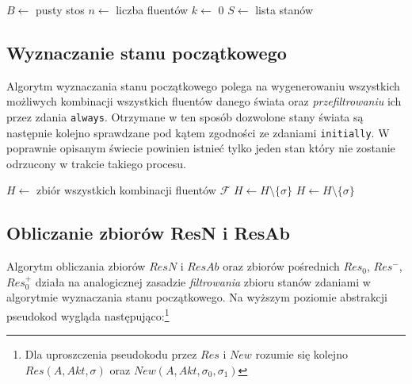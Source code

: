 \documentclass{article}
\begin{document}
\begin{algorithm}[H]
\begin{algorithmic}
\State $B \gets $ pusty stos
\State $n \gets $ liczba fluentów
\State $k \gets $ 0
\State $S \gets $ lista stanów
    \EndIf
	\State {}
	\State {}
	\State {}
	\State {}
	\State {}
	\State {}
	\State {}
\EndFunction
\end{algorithmic}
\end{algorithm}

\newpage
\subsection{Wyznaczanie stanu początkowego}

Algorytm wyznaczania stanu początkowego polega na wygenerowaniu wszystkich możliwych kombinacji wszystkich fluentów danego świata oraz \textit{przefiltrowaniu} ich przez zdania \texttt{always}. Otrzymane w ten sposób dozwolone stany świata są następnie kolejno sprawdzane pod kątem zgodności ze zdaniami \texttt{initially}. W poprawnie opisanym świecie powinien istnieć tylko jeden stan który nie zostanie odrzucony w trakcie takiego procesu.

\begin{algorithm}[H]
\begin{algorithmic}
\State $H \gets $ zbiór wszystkich kombinacji fluentów $\mathcal{F}$
		\If{$\sigma \nvDash \alpha$}
			\State $H \gets H \setminus \{\sigma\}$
		\EndIf
	\EndFor
\EndFor
{}
		\If{$\sigma \nvDash \alpha$}
			\State $H \gets H \setminus \{\sigma\}$
		\EndIf
	\EndFor
\EndFor
\end{algorithmic}
\end{algorithm}

\newpage
\subsection{Obliczanie zbiorów ResN i ResAb}

Algorytm obliczania zbiorów $ResN$ i $ResAb$ oraz zbiorów pośrednich $Res_0$, $Res^{-}$, $Res^{+}_{0}$ działa na analogicznej zasadzie \textit{filtrowania} zbioru stanów zdaniami w algorytmie wyznaczania stanu początkowego. Na wyższym poziomie abstrakcji pseudokod wygląda następująco:\footnote{Dla uproszczenia pseudokodu przez $Res$ i $New$ rozumie się kolejno $Res(A,Akt,\sigma)$ oraz $New(A,Akt,\sigma_0,\sigma_1)$}
\end{document}
